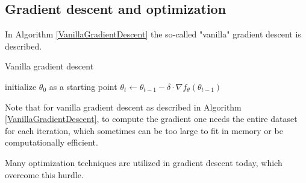 \subsection{Gradient descent and optimization}
In Algorithm \ref{VanillaGradientDescent} the so-called "vanilla" gradient descent is described.
\begin{algorithm}[H]
    \caption{Vanilla gradient descent} \label{VanillaGradientDescent}
\begin{algorithmic}[1]
    \State initialize $\theta_0$ as a starting point
    \State $\theta_t \gets \theta_{t-1} - \delta \cdot \nabla f_{\theta} (\theta_{t-1})$
    \EndWhile
\end{algorithmic}
\end{algorithm}

Note that for vanilla gradient descent as described in Algorithm \ref{VanillaGradientDescent}, to compute the gradient one needs the entire dataset for each iteration,
which sometimes can be too large to fit in memory or be computationally efficient.

Many optimization techniques are utilized in gradient descent today, which overcome this hurdle.
